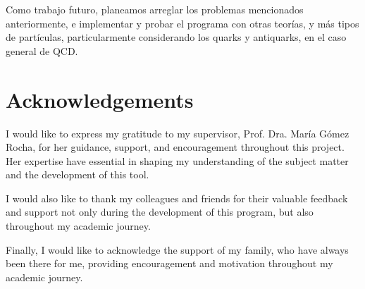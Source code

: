 \documentclass[11pt,a4paper,twoside,pdf]{article}
\numberwithin{equation}{section}
\begin{document}
Como trabajo futuro, planeamos arreglar los problemas mencionados anteriormente, e implementar y
probar el programa con otras teor\'ias, y m\'as tipos de part\'iculas, particularmente
considerando los quarks y antiquarks, en el caso general de QCD.

\section*{Acknowledgements}

I would like to express my gratitude to my supervisor, Prof. Dra. María Gómez Rocha,
for her guidance, support, and encouragement throughout this project. Her expertise 
have essential in shaping my understanding of the subject matter and 
the development of this tool.

I would also like to thank my colleagues and friends for their valuable feedback and
support not only during the development of this program, but also throughout my academic journey.

Finally, I would like to acknowledge the support of my family, who have always been there
for me, providing encouragement and motivation throughout my academic journey. 



\newpage
\appendix

\newpage

\end{document}
